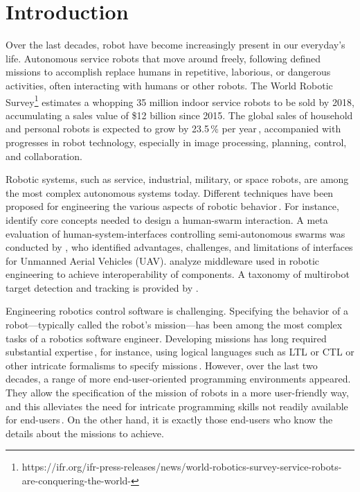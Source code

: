 \section{Introduction}
Over the last decades, robot have become increasingly present in our everyday's life. Autonomous service robots that move around freely, following defined missions to accomplish replace humans in repetitive, laborious, or dangerous activities, often interacting with humans or other robots. The World Robotic Survey\footnote{https://ifr.org/ifr-press-releases/news/world-robotics-survey-service-robots-are-conquering-the-world-} estimates a whopping 35 million indoor service robots to be sold by 2018, accumulating a sales value of \$12 billion since 2015. The global sales of household and personal robots is expected to grow by 23.5\,\% per year\,\cite{sheng:online}, accompanied with progresses in robot technology, especially in image processing, planning, control, and collaboration.

Robotic systems, such as service, industrial, military, or space robots, are among the most complex autonomous systems today. Different techniques have been proposed for engineering the various aspects of robotic behavior\,\cite{Fernandez-Perdomo2010,DiRuscio2014,Doherty2013,AtrickD..Ulam2010}. For instance, \citet{Kolling2016} identify core concepts needed to design a human-swarm interaction. A meta evaluation of human-system-interfaces controlling semi-autonomous swarms was conducted by \citet{Hocraffer2017}, who identified advantages, challenges, and limitations of interfaces for Unmanned Aerial Vehicles (UAV). \citet{Mohamed2008} analyze middleware used in robotic engineering to achieve interoperability of components. A taxonomy of multirobot target detection and tracking is provided by \citet{Robin2016}.

Engineering robotics control software is challenging. Specifying the behavior of a robot---typically called the robot's mission---has been among the most complex tasks of a robotics software engineer. Developing missions has long required substantial expertise\,\cite{Brugali2009,Aragao2016}, for instance, using logical languages such as LTL or CTL or other intricate formalisms to specify missions\,\cite{Luckcuck2018}.
However, over the last two decades, a range of more end-user-oriented programming environments appeared. They allow the specification of the mission of robots in a more user-friendly way, and this alleviates the need for intricate programming skills not readily available for end-users\,\cite{Weintrop2018,Bozhinoski2016b}. On the other hand, it is exactly those end-users who know the details about the missions to achieve.

